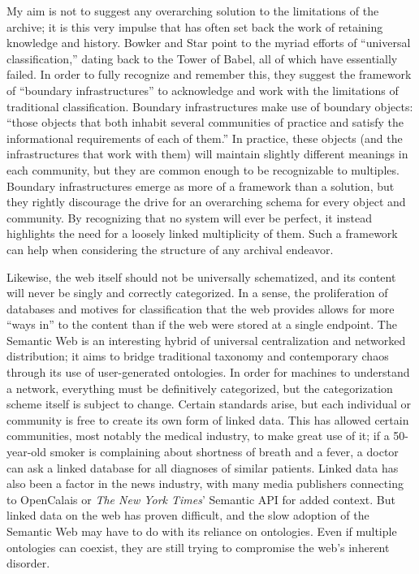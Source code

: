 My aim is not to suggest any overarching solution to the limitations of the archive; it is this very impulse that has often set back the work of retaining knowledge and history. Bowker and Star point to the myriad efforts of ``universal classification,'' dating back to the Tower of Babel, all of which have essentially failed. In order to fully recognize and remember this, they suggest the framework of ``boundary infrastructures'' to acknowledge and work with the limitations of traditional classification. Boundary infrastructures make use of boundary objects: ``those objects that both inhabit several communities of practice and satisfy the informational requirements of each of them.''\autocite[297]{bowker_sorting_2000} In practice, these objects (and the infrastructures that work with them) will maintain slightly different meanings in each community, but they are common enough to be recognizable to multiples. Boundary infrastructures emerge as more of a framework than a solution, but they rightly discourage the drive for an overarching schema for every object and community. By recognizing that no system will ever be perfect, it instead highlights the need for a loosely linked multiplicity of them. Such a framework can help when considering the structure of any archival endeavor.

Likewise, the web itself should not be universally schematized, and its content will never be singly and correctly categorized. In a sense, the proliferation of databases and motives for classification that the web provides allows for more ``ways in'' to the content than if the web were stored at a single endpoint. %
The Semantic Web is an interesting hybrid of universal centralization and networked distribution; it aims to bridge traditional taxonomy and contemporary chaos through its use of user-generated ontologies. In order for machines to understand a network, everything must be definitively categorized, but the categorization scheme itself is subject to change. Certain standards arise, but each individual or community is free to create its own form of linked data. This has allowed certain communities, most notably the medical industry, to make great use of it; if a 50-year-old smoker is complaining about shortness of breath and a fever, a doctor can ask a linked database for all diagnoses of similar patients. Linked data has also been a factor in the news industry, with many media publishers connecting to OpenCalais or \emph{The New  York Times}' Semantic API for added context. But linked data on the web has proven difficult, and the slow adoption of the Semantic Web may have to do with its reliance on ontologies. Even if multiple ontologies can coexist, they are still trying to compromise the web's inherent disorder.


